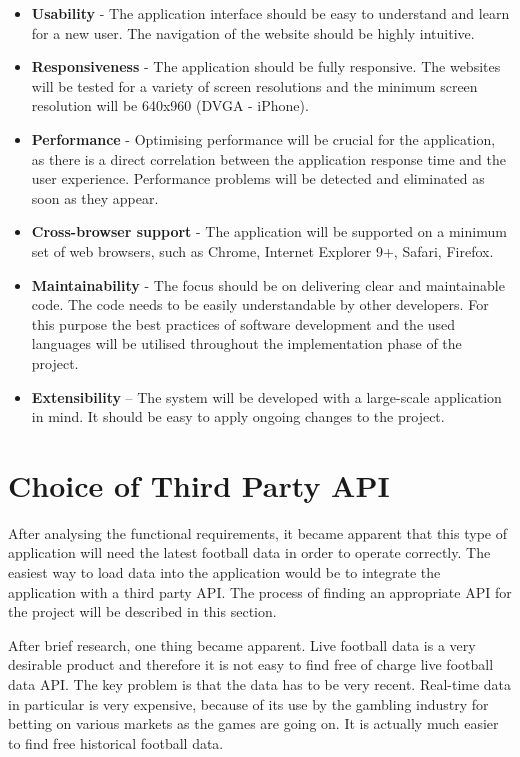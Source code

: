 \begin{itemize}
	\item \textbf{Usability} - The application interface should be easy to understand and learn for a new user. The navigation of the website should be highly intuitive.
	\item \textbf{Responsiveness} - The application should be fully responsive. The websites will be tested for a variety of screen resolutions and the minimum screen resolution will be 640x960 (DVGA - iPhone).
	\item \textbf{Performance} - Optimising performance will be crucial for the application, as there is a direct correlation between the application response time and the user experience.  Performance problems will be detected and eliminated as soon as they appear.
	\item \textbf{Cross-browser support} - The application will be supported on a minimum set of web browsers, such as Chrome, Internet Explorer 9+, Safari, Firefox.
	\item \textbf{Maintainability} - The focus should be on delivering clear and maintainable code. The code needs to be easily understandable by other developers. For this purpose the best practices of software development and the used languages will be utilised throughout the implementation phase of the project.
	\item \textbf{Extensibility} – The system will be developed with a large-scale application in mind. It should be easy to apply ongoing changes to the project.
\end{itemize}

\section{Choice of Third Party API}
\label{sec:thirdpartyapi_req}
	
After analysing the functional requirements, it became apparent that this type of application will need the latest football data in order to operate correctly. The easiest way to load data into the application would be to integrate the application with a third party API. The process of finding an appropriate API for the project will be described in this section.
	
After brief research, one thing became apparent. Live football data is a very desirable product and therefore it is not easy to find free of charge live football data API. The key problem is that the data has to be very recent. Real-time data in particular is very expensive, because of its use by the gambling industry for betting on various markets as the games are going on. It is actually much easier to find free historical football data. 
	
